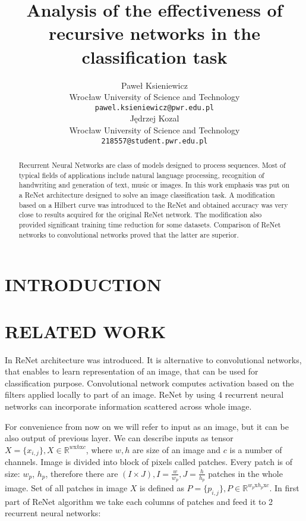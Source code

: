 \documentclass[a4paper, 10 pt, conference]{ieeeconf}
\title{\LARGE \bf
Analysis of the effectiveness of recursive
networks in the classification task
}
\author{\parbox{2 in}{\centering Paweł Ksieniewicz \\
        Wrocław University of Science and Technology\\
        {\tt\small pawel.ksieniewicz@pwr.edu.pl}}
        \hspace*{ 0.3 in}
        \parbox{2 in}{\centering Jędrzej Kozal \\
        Wrocław University of Science and Technology\\
        {\tt\small 218557@student.pwr.edu.pl}}
}
\begin{document}
\maketitle
\thispagestyle{empty}
\pagestyle{empty}

\begin{abstract}

Recurrent Neural Networks are class of models designed to process sequences. Most of typical fields of applications include natural language processing, recognition of handwriting and generation of text, music or images. In this work emphasis was put on a ReNet architecture designed to solve an image classification task. A modification based on a Hilbert curve was introduced to the ReNet and obtained accuracy was very close to results acquired for the original ReNet network. The modification also provided significant training time reduction for some datasets. Comparison of ReNet networks to convolutional networks proved that the latter are superior.

\end{abstract}


\section{INTRODUCTION}

\cite{Goodfellow-et-al-2016}

 

\section{RELATED WORK}

In \cite{DBLP:journals/corr/VisinKCMCB15} ReNet architecture was introduced. It is alternative to convolutional networks, that enables to learn representation of an image, that can be used for classification purpose. Convolutional network computes activation based on the filters applied locally to part of an image. ReNet by using 4 recurrent neural networks can incorporate information scattered across whole image.

For convenience from now on we will refer to input as an image, but it can be also output of previous layer. We can describe inputs as tensor $X = \{x_{i,j}\}, X \in \mathbb{R}^{w \textrm{x} h \textrm{x} c}$, where $w, h$ are size of an image and $c$ is a number of channels. Image is divided into block of pixels called patches. Every patch is of size: $w_p$, $h_p$, therefore there are $(I \times J),I=\frac{w}{w_p}, J=\frac{h}{h_p}$ patches in the whole image. Set of all patches in image $X$ is defined as $P = \{p_{i,j}\}, P \in \mathbb{R}^{w_p \textrm{x} h_p \textrm{x} c}$. In first part of ReNet algorithm we take each columns of patches and feed it to 2 recurrent neural networks: 
\end{document}
